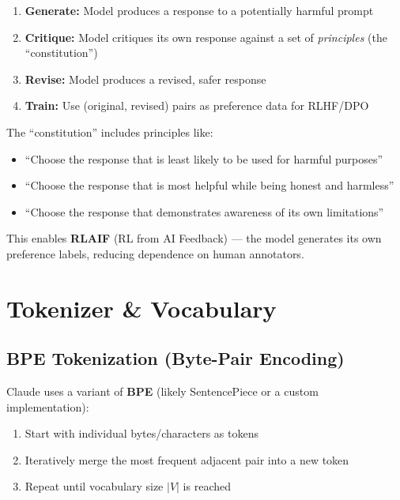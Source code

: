 \documentclass[11pt,a4paper]{article}
\begin{document}
\begin{tcolorbox}[colback=green!5, colframe=green!50!black, title={\bfseries Constitutional AI Loop}]
\begin{enumerate}[itemsep=2pt]
  \item \textbf{Generate:} Model produces a response to a potentially harmful prompt
  \item \textbf{Critique:} Model critiques its own response against a set of \textit{principles} (the ``constitution'')
  \item \textbf{Revise:} Model produces a revised, safer response
  \item \textbf{Train:} Use (original, revised) pairs as preference data for RLHF/DPO
\end{enumerate}
\end{tcolorbox}

The ``constitution'' includes principles like:
\begin{itemize}[itemsep=1pt]
  \item ``Choose the response that is least likely to be used for harmful purposes''
  \item ``Choose the response that is most helpful while being honest and harmless''
  \item ``Choose the response that demonstrates awareness of its own limitations''
\end{itemize}

This enables \textbf{RLAIF} (RL from AI Feedback) --- the model generates its own preference labels, reducing dependence on human annotators.

\section{Tokenizer \& Vocabulary}

\subsection{BPE Tokenization (Byte-Pair Encoding)}

Claude uses a variant of \textbf{BPE} (likely SentencePiece or a custom implementation):

\begin{enumerate}[itemsep=1pt]
  \item Start with individual bytes/characters as tokens
  \item Iteratively merge the most frequent adjacent pair into a new token
  \item Repeat until vocabulary size $|V|$ is reached
\end{enumerate}
\end{document}
